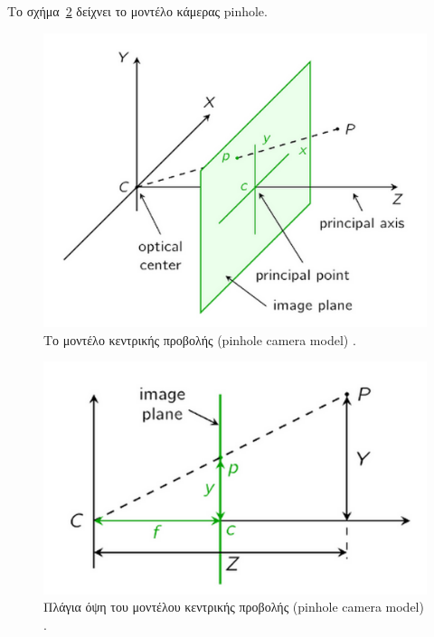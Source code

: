 Το σχήμα~\ref{fig:pinhole2} δείχνει το μοντέλο κάμερας pinhole. 




\begin{figure}[H]
    \centering
    \includegraphics[scale=0.5, angle=0]{Files/Figures/pinhole1.png}
    \caption[Το μοντέλο κεντρικής προβολής στις 3 διαστάσεις (pinhole camera model)]{ Το μοντέλο κεντρικής προβολής (pinhole camera model) \cite{pinhole} .}
    \label{fig:pinhole1}
\end{figure}


\begin{figure}[H]
    \centering
    \includegraphics[scale=0.5, angle=0]{Files/Figures/pinhole2.png}
    \caption[Πλάγια όψη του μοντέλου κεντρικής προβολής 2D (pinhole camera model)]{ Πλάγια όψη του μοντέλου κεντρικής προβολής (pinhole camera model) \cite{pinhole} .}
    \label{fig:pinhole2}
\end{figure}

